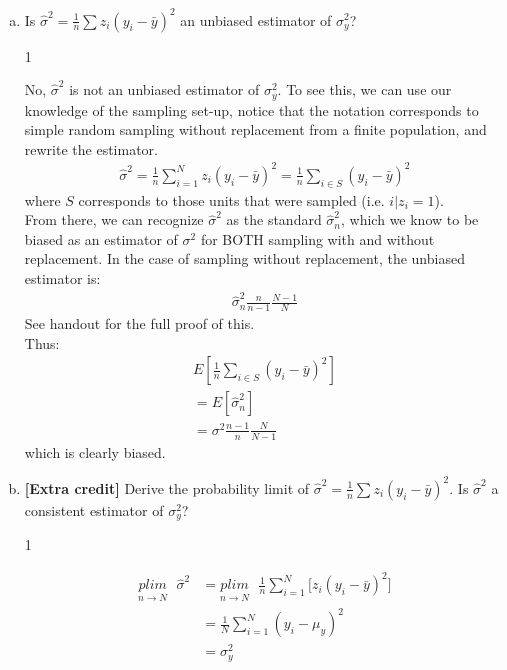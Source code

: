 \documentclass[12pt,letterpaper]{article}
\newcommand{\solutions}{0}
\begin{document}
\begin{enumerate}[(a)]
\item Is $\hat{\sigma}^2=\frac{1}{n}\sum z_i(y_i-\bar{y})^2$ an unbiased estimator of $\sigma^2_y$?

\if\solutions1
{\color{red}
No, $\hat{\sigma}^2$ is not an unbiased estimator of $\sigma^2_y$. To see this, we can use our knowledge of the sampling set-up, notice that the notation corresponds to simple random sampling without replacement from a finite population, and rewrite the estimator.
\begin{align*}
\hat{\sigma}^2 = \frac{1}{n}\sum_{i=1}^N z_i(y_i-\bar{y})^2 = \frac{1}{n}\sum_{i \in S} (y_i-\bar{y})^2
\end{align*}
where $S$ corresponds to those units that were sampled (i.e. $i | z_i = 1$). \\

From there, we can recognize $\hat{\sigma}^2$ as the standard $\hat{\sigma}_n^2$, which we know to be biased as an estimator of $\sigma^2$ for BOTH sampling with and without replacement. In the case of sampling without replacement, the unbiased estimator is:
\begin{align*}
\hat{\sigma}_n^2 \frac{n}{n-1} \frac{N-1}{N}
\end{align*}
See handout for the full proof of this. \\

Thus:
\begin{align*}
E \left[ \frac{1}{n}\sum_{i \in S} (y_i-\bar{y})^2 \right] \\
= E \left[ \hat{\sigma}_n^2 \right] \\
= \sigma^2 \frac{n-1}{n} \frac{N}{N-1}
\end{align*}
which is clearly biased.

}
\fi

\item \textbf{[Extra credit]} Derive the probability limit of $\hat{\sigma}^2=\frac{1}{n}\sum z_i(y_i-\bar{y})^2$. Is $\hat{\sigma}^2$ a consistent estimator of $\sigma^2_y$?

\if\solutions1
{\color{red}
\begin{align*}
\underset{n\to N}{plim}\text{ } \hat{\sigma}^2 & = \underset{n\to N}{plim}\text{ } \frac{1}{n}\sum_{i=1}^N \bigg[z_i(y_i-\bar{y})^2 \bigg] \\
&= \frac{1}{N}\sum_{i=1}^N (y_i-\mu_y)^2 \\
&= \sigma^2_y
\end{align*}




}
\end{enumerate}
\end{document}
